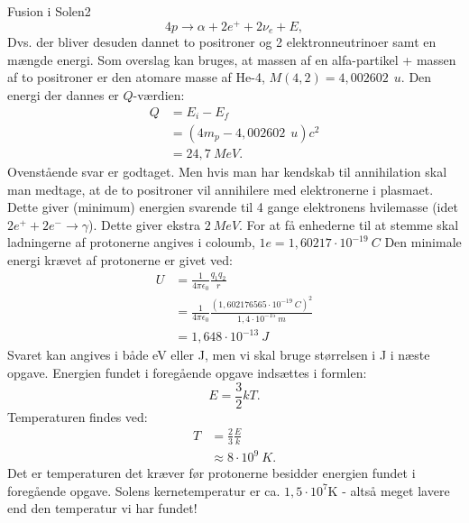 \begin{opgave}{Fusion i Solen}{2}
\begin{equation*}
4p \rightarrow \alpha + 2e^+ + 2\nu_e + E,
\end{equation*}
Dvs. der bliver desuden dannet to positroner og 2 elektronneutrinoer samt en mængde energi.
\opg Som overslag kan bruges, at massen af en alfa-partikel + massen af to positroner er den atomare masse af He-4, $M(4,2)=4,002602~\SI{}{u}$. Den energi der dannes er $Q$-værdien:
\begin{align*}
Q &= E_i - E_f \\
&= (4m_p - 4,002602~\SI{}{u})c^2 \\
&= 24,7 ~\si{MeV}.
\end{align*}
Ovenstående svar er godtaget. Men hvis man har kendskab til annihilation skal man medtage, at de to positroner vil annihilere med elektronerne i plasmaet. Dette giver (minimum) energien svarende til 4 gange elektronens hvilemasse (idet $2e^+ + 2e^- \rightarrow \gamma$). Dette giver ekstra $2~\si{MeV}$.
\opg For at få enhederne til at stemme skal ladningerne af protonerne angives i coloumb, $1e = 1,60217 \cdot 10^{-19}~\si{C}$ Den minimale energi krævet af protonerne er givet ved:
\begin{align*}
U &= \frac{1}{4\pi\epsilon_0} \frac{q_1q_2}{r} \\
&= \frac{1}{4\pi\epsilon_0} \frac{\left( 1,602 176565 \cdot 10^{-19}~\si{C}\right)^2}{1,4 \cdot 10^{-15}~\si{m}} \\
&= 1,648 \cdot 10^{-13}~\si{J}
\end{align*}
Svaret kan angives i både eV eller J, men vi skal bruge størrelsen i J i næste opgave.
\opg Energien fundet i foregående opgave indsættes i formlen:
\begin{equation*}
E = \frac{3}{2} k T.
\end{equation*}
Temperaturen findes ved:
\begin{align*}
T &= \frac{2}{3} \frac{E}{k} \\
&\approx 8 \cdot 10^9 ~\si{K}.
\end{align*}
Det er temperaturen det kræver før protonerne besidder energien fundet i foregående opgave.
Solens kernetemperatur er ca. $1,5 \cdot 10^7$K - altså meget lavere end den temperatur vi har fundet!


\end{opgave}
